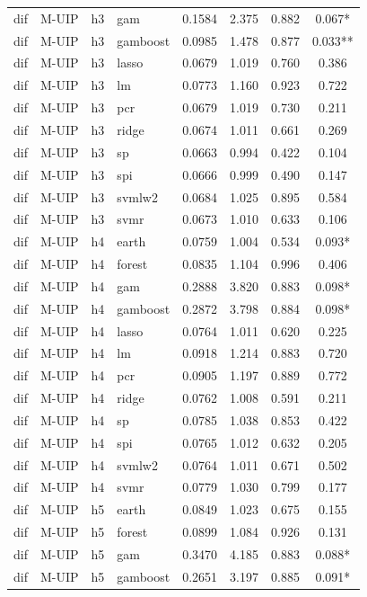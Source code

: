 \begin{ThreePartTable}
\begin{longtable}[t]{llclcccc}
dif & M-UIP & h3 & gam & 0.1584 & 2.375 & 0.882 & 0.067*\\
dif & M-UIP & h3 & gamboost & 0.0985 & 1.478 & 0.877 & 0.033**\\
dif & M-UIP & h3 & lasso & 0.0679 & 1.019 & 0.760 & 0.386\\
dif & M-UIP & h3 & lm & 0.0773 & 1.160 & 0.923 & 0.722\\
dif & M-UIP & h3 & pcr & 0.0679 & 1.019 & 0.730 & 0.211\\
dif & M-UIP & h3 & ridge & 0.0674 & 1.011 & 0.661 & 0.269\\
dif & M-UIP & h3 & sp & 0.0663 & 0.994 & 0.422 & 0.104\\
dif & M-UIP & h3 & spi & 0.0666 & 0.999 & 0.490 & 0.147\\
dif & M-UIP & h3 & svmlw2 & 0.0684 & 1.025 & 0.895 & 0.584\\
dif & M-UIP & h3 & svmr & 0.0673 & 1.010 & 0.633 & 0.106\\
\addlinespace
dif & M-UIP & h4 & earth & 0.0759 & 1.004 & 0.534 & 0.093*\\
dif & M-UIP & h4 & forest & 0.0835 & 1.104 & 0.996 & 0.406\\
dif & M-UIP & h4 & gam & 0.2888 & 3.820 & 0.883 & 0.098*\\
dif & M-UIP & h4 & gamboost & 0.2872 & 3.798 & 0.884 & 0.098*\\
dif & M-UIP & h4 & lasso & 0.0764 & 1.011 & 0.620 & 0.225\\
dif & M-UIP & h4 & lm & 0.0918 & 1.214 & 0.883 & 0.720\\
dif & M-UIP & h4 & pcr & 0.0905 & 1.197 & 0.889 & 0.772\\
dif & M-UIP & h4 & ridge & 0.0762 & 1.008 & 0.591 & 0.211\\
dif & M-UIP & h4 & sp & 0.0785 & 1.038 & 0.853 & 0.422\\
dif & M-UIP & h4 & spi & 0.0765 & 1.012 & 0.632 & 0.205\\
dif & M-UIP & h4 & svmlw2 & 0.0764 & 1.011 & 0.671 & 0.502\\
dif & M-UIP & h4 & svmr & 0.0779 & 1.030 & 0.799 & 0.177\\
\addlinespace
dif & M-UIP & h5 & earth & 0.0849 & 1.023 & 0.675 & 0.155\\
dif & M-UIP & h5 & forest & 0.0899 & 1.084 & 0.926 & 0.131\\
dif & M-UIP & h5 & gam & 0.3470 & 4.185 & 0.883 & 0.088*\\
dif & M-UIP & h5 & gamboost & 0.2651 & 3.197 & 0.885 & 0.091*\\

\end{longtable}
\end{ThreePartTable}
